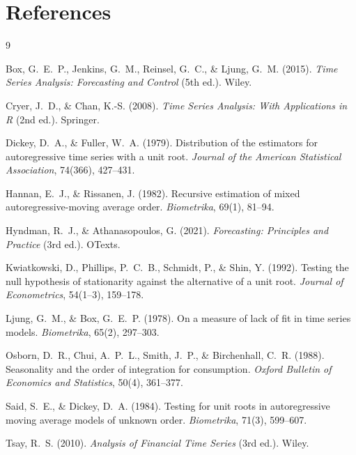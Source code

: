 \section*{References}
\begin{thebibliography}{9}
\setlength{\itemsep}{0.15em}

Box, G.~E.~P., Jenkins, G.~M., Reinsel, G.~C., \& Ljung, G.~M. (2015).
\emph{Time Series Analysis: Forecasting and Control} (5th ed.). Wiley.

Cryer, J.~D., \& Chan, K.-S. (2008).
\emph{Time Series Analysis: With Applications in R} (2nd ed.). Springer.

Dickey, D.~A., \& Fuller, W.~A. (1979). Distribution of the estimators for
autoregressive time series with a unit root. \emph{Journal of the American
Statistical Association}, 74(366), 427--431.

Hannan, E.~J., \& Rissanen, J. (1982). Recursive estimation of mixed
autoregressive-moving average order. \emph{Biometrika}, 69(1), 81--94.

Hyndman, R.~J., \& Athanasopoulos, G. (2021).
\emph{Forecasting: Principles and Practice} (3rd ed.). OTexts.

Kwiatkowski, D., Phillips, P.~C.~B., Schmidt, P., \& Shin, Y. (1992). Testing the
null hypothesis of stationarity against the alternative of a unit root.
\emph{Journal of Econometrics}, 54(1--3), 159--178.

Ljung, G.~M., \& Box, G.~E.~P. (1978). On a measure of lack of fit in time series
models. \emph{Biometrika}, 65(2), 297--303.

Osborn, D.~R., Chui, A.~P.~L., Smith, J.~P., \& Birchenhall, C.~R. (1988).
Seasonality and the order of integration for consumption.
\emph{Oxford Bulletin of Economics and Statistics}, 50(4), 361--377.

Said, S.~E., \& Dickey, D.~A. (1984). Testing for unit roots in autoregressive
moving average models of unknown order. \emph{Biometrika}, 71(3), 599--607.

Tsay, R.~S. (2010). \emph{Analysis of Financial Time Series} (3rd ed.). Wiley.

\end{thebibliography}


